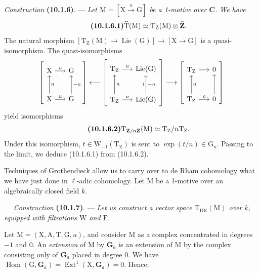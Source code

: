 \documentclass[11pt,leqno]{article}
\newcommand{\Page}[1]{\ifvmode\noindent\else\unskip\ \fi{\footnotesize\textcolor{gray}{[p.\,#1]}}\ \ignorespaces}
\begin{document}
\textit{Construction} \textbf{(10.1.6)}. —
\textit{Let \(\mathrm{M}=[\mathrm{X}\xrightarrow{u}\mathrm{G}]\)
be a 1-motive over \(\mathbf{C}\). We have}
\[
\tag*{\textbf{(10.1.6.1)}}
\widehat{\mathrm{T}}(\mathrm{M})
\simeq\mathrm{T}_{\mathrm{Z}}(\mathrm{M})\otimes\widehat{\mathbf{Z}}.
\]
The natural morphism
\([\mathrm{T}_{\mathrm{Z}}(\mathrm{M})\to\operatorname{Lie}(\mathrm{G})]
\to[\mathrm{X}\to\mathrm{G}]\) is a quasi-isomorphism.
The quasi-isomorphisms
\[
{
\left[
\begin{tikzcd}[ampersand replacement=\&, column sep=1.5em, row sep=2.6em]
\mathrm{X} \arrow[r, "u"] \& \mathrm{G}
\\
\mathrm{X} \arrow[r, "u"] \arrow[u, "n"']
\& \mathrm{G} \arrow[u, "-n"']
\end{tikzcd}
\right]
}
\longleftarrow
{
\left[
\begin{tikzcd}[ampersand replacement=\&, column sep=1.5em, row sep=2.6em]
\mathrm{T}_{\mathrm{Z}} \arrow[r, "u"]
\& \operatorname{Lie}(\mathrm{G})
\\
\mathrm{T}_{\mathrm{Z}} \arrow[r, "u"] \arrow[u, "n"']
\& \operatorname{Lie}(\mathrm{G}) \arrow[u, "\wr", "-n"']
\end{tikzcd}
\right]
}
\longrightarrow
{
\left[
\begin{tikzcd}[ampersand replacement=\&, column sep=1.5em, row sep=2.6em]
\mathrm{T}_{\mathrm{Z}} \arrow[r] \& 0
\\
\mathrm{T}_{\mathrm{Z}} \arrow[r, "c"] \arrow[u, "n"']
\& 0 \arrow[u]
\end{tikzcd}
\right]
}
\]
yield isomorphisms
\[
\tag*{\textbf{(10.1.6.2)}}
\mathrm{T}_{\mathbf{Z}/n\mathbf{Z}}(\mathrm{M})
\simeq\mathrm{T}_{\mathrm{Z}}/n\mathrm{T}_{\mathrm{Z}}.
\]
Under this isomorphism, \(t\in\mathrm{W}_{-1}(\mathrm{T}_{\mathrm{Z}})\)
is sent to \(\exp(t/n)\in\mathrm{G}_n\). Passing to the limit,
we deduce (10.1.6.1) from (10.1.6.2).

Techniques of Grothendieck allow us to carry over to de Rham
cohomology what we have just done in \(\ell\)-adic cohomology.
Let \(\mathrm{M}\) be a 1-motive over an algebraically closed field \(k\).

\Page{58}
\textit{Construction} \textbf{(10.1.7)}. —
\textit{Let us construct a vector space
\(\mathrm{T}_{\mathrm{DR}}(\mathrm{M})\) over \(k\), equipped with filtrations
\(\mathrm{W}\) and \(\mathrm{F}\).}

Let \(\mathrm{M}=(\mathrm{X},\mathrm{A},\mathrm{T},\mathrm{G},u)\),
and consider \(\mathrm{M}\) as a complex concentrated in degrees
\(-1\) and 0. An \textit{extension} of \(\mathrm{M}\) by
\(\mathbf{G}_a\) is an extension of \(\mathrm{M}\) by the complex
consisting only of \(\mathbf{G}_a\) placed in degree 0. We have
\(\operatorname{Hom}(\mathrm{G},\mathbf{G}_a)
=\operatorname{Ext}^1(\mathrm{X},\mathbf{G}_a)=0\).
Hence:
\end{document}
